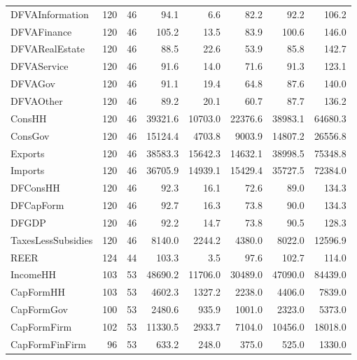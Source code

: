 {\begin{tabular}[t]{lrrrrrrr}
DFVAInformation & 120 & 46 & \num{94.1} & \num{6.6} & \num{82.2} & \num{92.2} & \num{106.2}\\
DFVAFinance & 120 & 46 & \num{105.2} & \num{13.5} & \num{83.9} & \num{100.6} & \num{146.0}\\
DFVARealEstate & 120 & 46 & \num{88.5} & \num{22.6} & \num{53.9} & \num{85.8} & \num{142.7}\\
DFVAService & 120 & 46 & \num{91.6} & \num{14.0} & \num{71.6} & \num{91.3} & \num{123.1}\\
DFVAGov & 120 & 46 & \num{91.1} & \num{19.4} & \num{64.8} & \num{87.6} & \num{140.0}\\
DFVAOther & 120 & 46 & \num{89.2} & \num{20.1} & \num{60.7} & \num{87.7} & \num{136.2}\\
ConsHH & 120 & 46 & \num{39321.6} & \num{10703.0} & \num{22376.6} & \num{38983.1} & \num{64680.3}\\
ConsGov & 120 & 46 & \num{15124.4} & \num{4703.8} & \num{9003.9} & \num{14807.2} & \num{26556.8}\\
Exports & 120 & 46 & \num{38583.3} & \num{15642.3} & \num{14632.1} & \num{38998.5} & \num{75348.8}\\
Imports & 120 & 46 & \num{36705.9} & \num{14939.1} & \num{15429.4} & \num{35727.5} & \num{72384.0}\\
DFConsHH & 120 & 46 & \num{92.3} & \num{16.1} & \num{72.6} & \num{89.0} & \num{134.3}\\
DFCapForm & 120 & 46 & \num{92.7} & \num{16.3} & \num{73.8} & \num{90.0} & \num{134.3}\\
DFGDP & 120 & 46 & \num{92.2} & \num{14.7} & \num{73.8} & \num{90.5} & \num{128.3}\\
TaxesLessSubsidies & 120 & 46 & \num{8140.0} & \num{2244.2} & \num{4380.0} & \num{8022.0} & \num{12596.9}\\
REER & 124 & 44 & \num{103.3} & \num{3.5} & \num{97.6} & \num{102.7} & \num{114.0}\\
IncomeHH & 103 & 53 & \num{48690.2} & \num{11706.0} & \num{30489.0} & \num{47090.0} & \num{84439.0}\\
CapFormHH & 103 & 53 & \num{4602.3} & \num{1327.2} & \num{2238.0} & \num{4406.0} & \num{7839.0}\\
CapFormGov & 100 & 53 & \num{2480.6} & \num{935.9} & \num{1001.0} & \num{2323.0} & \num{5373.0}\\
CapFormFirm & 102 & 53 & \num{11330.5} & \num{2933.7} & \num{7104.0} & \num{10456.0} & \num{18018.0}\\
CapFormFinFirm & 96 & 53 & \num{633.2} & \num{248.0} & \num{375.0} & \num{525.0} & \num{1330.0}\\

\end{tabular}}
